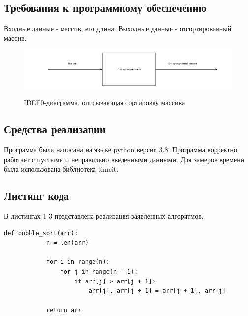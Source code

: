 \documentclass[a4paper, 14pt]{article}
\begin{document}
		\subsection{Требования к программному обеспечению}
		Входные данные - массив, его длина.
		Выходные данные - отсортированный массив.
        	\begin{figure}[h]
        	\begin{center}
        		{\includegraphics[scale=0.48]{idef0_scheme}}
        		\caption{IDEF0-диаграмма, описывающая сортировку массива}
        	\end{center}
        \end{figure}
		\subsection{Средства реализации}
		\parindent=0cm		
		Программа была написана на языке python версии 3.8.
		Программа корректно работает с пустыми и неправильно введенными данными.
		Для замеров времени была использована библиотека timeit.\\
        \subsection{Листинг кода} 
        В листингах 1-3 представлена реализация заявленных алгоритмов.
		\begin{lstlisting}[label=some-code,caption=Алгоритм сортировки пузырьком]
		def bubble_sort(arr):
    		n = len(arr)

    		for i in range(n):
        		for j in range(n - 1):
            		if arr[j] > arr[j + 1]:
                		arr[j], arr[j + 1] = arr[j + 1], arr[j]

    		return arr
		\end{lstlisting}        
		
\end{document}
